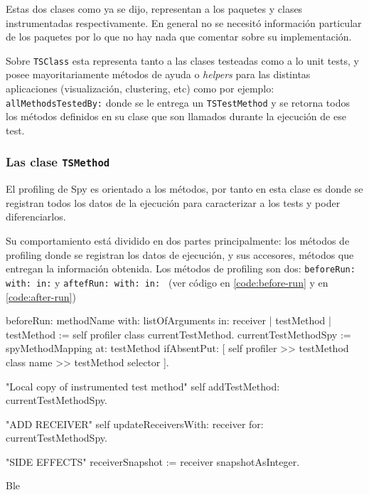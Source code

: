 \par Estas dos clases como ya se dijo, representan a los paquetes y clases instrumentadas respectivamente. En general no se necesitó información particular de los paquetes por lo que no hay nada que comentar sobre su implementación.

\par Sobre {\tt TSClass} esta representa tanto a las clases testeadas como a lo unit tests, y posee mayoritariamente métodos de ayuda o \emph{helpers} para las distintas aplicaciones (visualización, clustering, etc) como por ejemplo: {\tt allMethodsTestedBy:} donde se le entrega un {\tt TSTestMethod} y se retorna todos los métodos definidos en su clase que son llamados durante la ejecución de ese test.  

\subsubsection{Las clase {\tt TSMethod} }
\par El profiling de Spy es orientado a los métodos, por tanto en esta clase es donde se registran todos los datos de la ejecución para caracterizar a los tests y poder diferenciarlos.
\par Su comportamiento está dividido en dos partes principalmente: los métodos de profiling donde se registran los datos de ejecución, y sus accesores, métodos que entregan la información obtenida. Los métodos de profiling son dos: {\tt beforeRun: with: in:} y {\tt aftefRun: with: in: } (ver código en \ref{code:before-run} y en \ref{code:after-run})

\begin{codeWithLineNumbers}
beforeRun: methodName with: listOfArguments in: receiver
	| testMethod |
	testMethod := self profiler class currentTestMethod.
	currentTestMethodSpy := 
			spyMethodMapping at: testMethod ifAbsentPut: 
				[ self profiler >> testMethod class name >> testMethod selector ].
		
	"Local copy of instrumented test method"	
	self addTestMethod: currentTestMethodSpy.

	"ADD RECEIVER"
	self updateReceiversWith: receiver for: currentTestMethodSpy.

	"SIDE EFFECTS"
	receiverSnapshot := receiver snapshotAsInteger.

\end{codeWithLineNumbers}\label{code:before-run} 
\caption{Ble}


